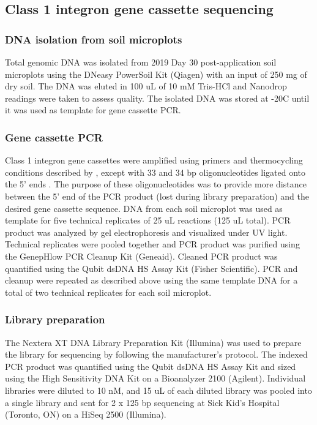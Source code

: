 \subsection{Class 1 integron gene cassette sequencing}

\subsubsection{DNA isolation from soil microplots} \label{methods:C1I_DNA-isolation}

Total genomic DNA was isolated from 2019 Day 30 post-application soil microplots using the DNeasy PowerSoil Kit (Qiagen) with an input of 250 mg of dry soil.
The DNA was eluted in 100 uL of 10 mM Tris-HCl and Nanodrop readings were taken to assess quality.
The isolated DNA was stored at -20\degree C until it was used as template for gene cassette PCR.

\subsubsection{Gene cassette PCR}

Class 1 integron gene cassettes were amplified using primers and thermocycling conditions described by \textcite{stokesGeneCassettePCR2001}, except with 33 and 34 bp oligonucleotides ligated onto the 5’ ends \dummyfig.
The purpose of these oligonucleotides was to provide more distance between the 5’ end of the PCR product (lost during library preparation) and the desired gene cassette sequence.
DNA from each soil microplot was used as template for five technical replicates of 25 uL reactions (125 uL total).
PCR product was analyzed by gel electrophoresis and visualized under UV light.
Technical replicates were pooled together and PCR product was purified using the GenepHlow PCR Cleanup Kit (Geneaid).
Cleaned PCR product was quantified using the Qubit dsDNA HS Assay Kit (Fisher Scientific).
PCR and cleanup were repeated as described above using the same template DNA for a total of two technical replicates for each soil microplot.

\subsubsection{Library preparation}

The Nextera XT DNA Library Preparation Kit (Illumina) was used to prepare the library for sequencing by following the manufacturer’s protocol.
The indexed PCR product was quantified using the Qubit dsDNA HS Assay Kit and sized using the High Sensitivity DNA Kit on a Bioanalyzer 2100 (Agilent).
Individual libraries were diluted to 10 nM, and 15 uL of each diluted library was pooled into a single library and sent for 2 x 125 bp sequencing at Sick Kid’s Hospital (Toronto, ON) on a HiSeq 2500 (Illumina).

